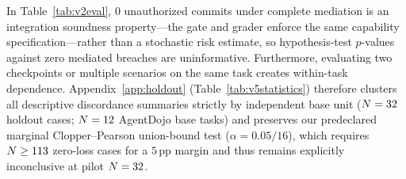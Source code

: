 

 In Table~\ref{tab:v2eval}, \(0\) unauthorized commits under complete mediation is an integration soundness property---the gate and grader enforce the same capability specification---rather than a stochastic risk estimate, so hypothesis-test \(p\)-values against zero mediated breaches are uninformative. Furthermore, evaluating two checkpoints or multiple scenarios on the same task creates within-task dependence. Appendix~\ref{app:holdout} (Table~\ref{tab:v5statistics}) therefore clusters all descriptive discordance summaries strictly by independent base unit (\(N = 32\) holdout cases; \(N = 12\) AgentDojo base tasks) and preserves our predeclared marginal Clopper--Pearson union-bound test (\(\alpha = 0.05/16\)), which requires \(N \ge 113\) zero-loss cases for a \(5\)\,pp margin and thus remains explicitly inconclusive at pilot \(N = 32\).

